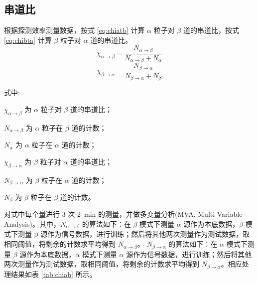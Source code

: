 \newpage

\subsection{串道比}

根据探测效率测量数据，按式 \ref{eq:chiatb} 计算 $\alpha$ 粒子对 $\beta$ 道的串道比，按式 \ref{eq:chibta} 计算 $\beta$ 粒子对 $\alpha$ 道的串道比。
\begin{equation}
    \label{eq:chiatb}
    \chi_{\alpha\rightarrow\beta} = \frac{N_{\alpha\rightarrow\beta}}{N_{\alpha\rightarrow\beta} + N_{\alpha}}
\end{equation}
\begin{equation}
    \label{eq:chibta}
    \chi_{\beta\rightarrow\alpha} = \frac{N_{\beta\rightarrow\alpha}}{N_{\beta\rightarrow\alpha} + N_{\beta}}
\end{equation}

式中:

$\chi_{\alpha\rightarrow\beta}$ 为 $\alpha$ 粒子对 $\beta$ 道的串道比；

$N_{\alpha\rightarrow\beta}$ 为 $\alpha$ 粒子在 $\beta$ 道的计数；

$N_{\alpha}$ 为 $\alpha$ 粒子在 $\alpha$ 道的计数；

$\chi_{\beta\rightarrow\alpha}$ 为 $\beta$ 粒子对 $\alpha$ 道的串道比；

$N_{\beta\rightarrow\alpha}$ 为 $\beta$ 粒子在 $\alpha$ 道的计数；

$N_{\beta}$ 为 $\beta$ 粒子在 $\beta$ 道的计数。

对式中每个量进行 3 次 \SI{2}{min} 的测量，并做多变量分析(MVA, Multi-Variable Analysis)。其中，$N_{\alpha\rightarrow\beta}$ 的算法如下：在 $\beta$ 模式下测量 $\alpha$ 源作为本底数据，$\beta$ 模式下测量 $\beta$ 源作为信号数据，进行训练；然后将其他两次测量作为测试数据，取相同阈值，将剩余的计数求平均得到 $N_{\alpha\rightarrow\beta}$。
$N_{\beta\rightarrow\alpha}$ 的算法如下：在 $\alpha$ 模式下测量 $\beta$ 源作为本底数据，$\alpha$ 模式下测量 $\alpha$ 源作为信号数据，进行训练；然后将其他两次测量作为测试数据，取相同阈值，将剩余的计数求平均得到 $N_{\beta\rightarrow\alpha}$。相应处理结果如表 \ref{tab:chiab} 所示。

